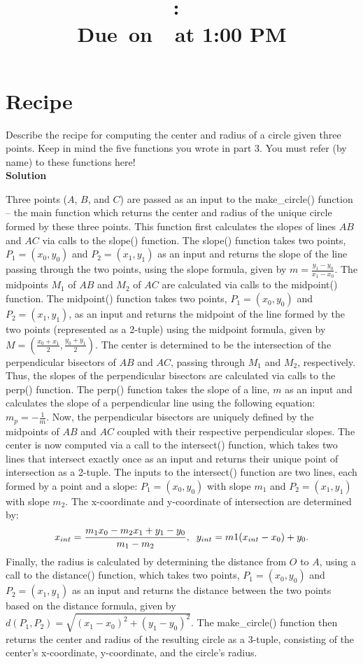 \documentclass{article}
\title{
    \vspace{2in}
    \textmd{\textbf{\hmwkClass:\ \hmwkTitle}}\\
    \normalsize\vspace{0.1in}\small{Due\ on\ \hmwkDueDate\ at 1:00 PM}\\
    \vspace{0.1in}\large{\textit{\hmwkClassInstructor}}
    \vspace{3in}
}
\author{\hmwkAuthorName}
\date{}
\begin{document}
\maketitle
\pagebreak

\section{Recipe}
   Describe the recipe for computing the center and radius of a circle given three points. Keep in mind the five functions you wrote in part 3. You must refer (by name) to these functions here!
   \\
   
   \textbf{Solution}
    
    Three points ($A$, $B$, and $C$) are passed as an input to the make\_circle() function -- the main function which returns the center and radius of the unique circle formed by these three points. This function first calculates the slopes of lines $AB$ and $AC$ via calls to the slope() function. The slope() function takes two points, $P_1 = (x_0, y_0)$ and $P_2 = (x_1, y_1)$ as an input and returns the slope of the line passing through the two points, using the slope formula, given by $m = \frac{y_1 - y_0}{x_1 - x_0}$. The midpoints $M_1$ of $AB$ and $M_2$ of $AC$ are calculated via calls to the midpoint() function. The midpoint() function takes two points, $P_1 = (x_0, y_0)$ and $P_2 = (x_1, y_1)$, as an input and returns the midpoint of the line formed by the two points (represented as a 2-tuple) using the midpoint formula, given by $M = (\frac{x_0 + x_1}{2}, \frac{y_0 + y_1}{2})$. The center is determined to be the intersection of the perpendicular bisectors of $AB$ and $AC$, passing through $M_1$ and $M_2$, respectively. Thus, the slopes of the perpendicular bisectors are calculated via calls to the perp() function. The perp() function takes the slope of a line, $m$ as an input and calculates the slope of a perpendicular line using the following equation: $m_p = -\frac{1}{m}$. Now, the perpendicular bisectors are uniquely defined by the midpoints of $AB$ and $AC$ coupled with their respective perpendicular slopes. The center is now computed via a call to the intersect() function, which takes two lines that intersect exactly once as an input and returns their unique point of intersection as a 2-tuple. The inputs to the intersect() function are two lines, each formed by a point and a slope: $P_1 = (x_0, y_0)$ with slope $m_1$ and $P_2 = (x_1, y_1)$ with slope $m_2$. The x-coordinate and y-coordinate of intersection are determined by:
    \[x_{int} = \frac{m_1x_0 - m_2x_1 + y_1 - y_0}{m_1 - m_2}, \hspace{.2cm} y_{int} = m1(x_{int} - x_0) + y_0.\] Finally, the radius is calculated by determining the distance from $O$ to $A$, using a call to the distance() function, which takes two points, $P_1 = (x_0, y_0)$ and $P_2 = (x_1, y_1)$ as an input and returns the distance between the two points based on the distance formula, given by $d(P_1, P_2) = \sqrt{(x_1- x_0)^2 + (y_1 - y_0)^2}$. The make\_circle() function then returns the center and radius of the resulting circle as a 3-tuple, consisting of the center's x-coordinate, y-coordinate, and the circle's radius.
   
\end{document}
